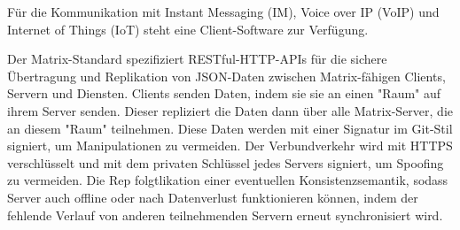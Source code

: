Für die Kommunikation mit Instant Messaging (IM), Voice over IP (VoIP) und Internet of Things (IoT) steht eine Client-Software zur Verfügung.

Der Matrix-Standard spezifiziert RESTful-HTTP-APIs für die sichere Übertragung und Replikation von JSON-Daten zwischen Matrix-fähigen Clients, Servern und Diensten. Clients senden Daten, indem sie sie an einen "Raum" auf ihrem Server senden. Dieser repliziert die Daten dann über alle Matrix-Server, die an diesem "Raum" teilnehmen. Diese Daten werden mit einer Signatur im Git-Stil signiert, um Manipulationen zu vermeiden. Der Verbundverkehr wird mit HTTPS verschlüsselt und mit dem privaten Schlüssel jedes Servers signiert, um Spoofing zu vermeiden. Die Rep folgtlikation einer eventuellen Konsistenzsemantik, sodass Server auch offline oder nach Datenverlust funktionieren können, indem der fehlende Verlauf von anderen teilnehmenden Servern erneut synchronisiert wird.

